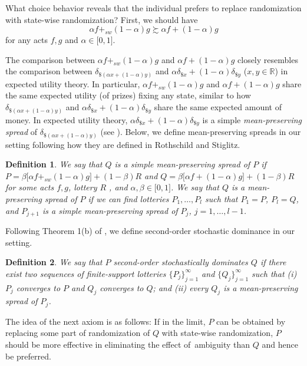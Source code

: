 \documentclass[12pt, notitlepage]{article}
\newtheorem{definition}{Definition}
\begin{document}
What choice behavior reveals that the individual prefers to replace
randomization with state-wise randomization? First, we should have%
\begin{equation}
\alpha f+_{sw}(1-\alpha )g\succsim \alpha f+(1-\alpha )g  \label{swr_r}
\end{equation}%
for any acts $f,g$ and $\alpha \in \lbrack 0,1]$.

The comparison between $\alpha f+_{sw}(1-\alpha )g$ and $\alpha f+(1-\alpha
)g$ closely resembles the comparison between $\delta _{\$(\alpha x+(1-\alpha
)y)}$ and $\alpha \delta _{\$x}+(1-\alpha )\delta _{\$y}$ ($x,y\in \mathbb{R}
$) in expected utility theory. In particular, $\alpha f+_{sw}(1-\alpha )g$
and $\alpha f+(1-\alpha )g$ share the same expected utility (of prizes)
fixing any state, similar to how $\delta _{\$(\alpha x+(1-\alpha )y)}$ and $%
\alpha \delta _{\$x}+(1-\alpha )\delta _{\$y}$ share the same expected
amount of money. In expected utility theory, $\alpha \delta _{\$x}+(1-\alpha
)\delta _{\$y}$ is a simple \textit{mean-preserving spread} of $\delta
_{\$(\alpha x+(1-\alpha )y)}$ (see \cite{RothschildStiglitz70}). Below, we
define mean-preserving spreads in our setting following how they are defined
in Rothschild and Stiglitz.

\begin{definition}
We say that $Q$ \textit{is a simple mean-preserving spread of} $P$ if $%
P=\beta \lbrack \alpha f+_{sw}(1-\alpha )g]+(1-\beta )R$ and $Q=\beta
\lbrack \alpha f+(1-\alpha )g]+(1-\beta )R$ for some acts $f,g$, lottery $R$%
, and $\alpha ,\beta \in \lbrack 0,1]$. We say that $Q$ is a mean-preserving
spread of $P$ if we can find lotteries $P_{1},\dots ,P_{l}$ such that $%
P_{1}=P$, $P_{l}=Q$, and $P_{j+1}$ is a simple mean-preserving spread of $%
P_{j}$, $j=1,\dots ,l-1$.
\end{definition}

Following Theorem 1(b) of \cite{RothschildStiglitz70}, we define
second-order stochastic dominance in our setting.

\begin{definition}
We say that $P$ \textit{second-order stochastically dominates} $Q$ if there
exist two sequences of finite-support lotteries $\{P_{j}\}_{j=1}^{\infty }$
and $\{Q_{j}\}_{j=1}^{\infty }$ such that (\textrm{i}) $P_{j}$ converges to $%
P$ and $Q_{j}$ converges to $Q$; and (\textrm{ii}) every $Q_{j}$ is a
mean-preserving spread of $P_{j}$.
\end{definition}

The idea of the next axiom is as follows: If in the limit, $P$ can be
obtained by replacing some part of randomization of $Q$ with state-wise
randomization, $P$ should be more effective in eliminating the effect of\
ambiguity than $Q$ and hence be preferred.
\end{document}

